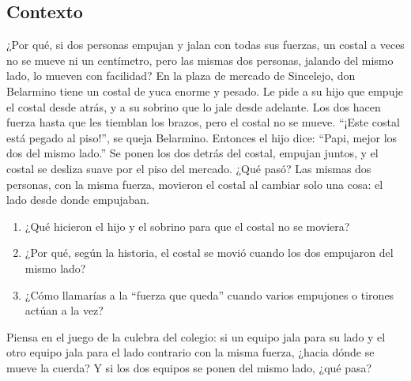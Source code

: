 \documentclass[
  spanish,
  letterpaper,
  12pt,
  oneside,
  open=any,
  DIV=15]{scrbook}
\providecommand{\tightlist}{%
  \setlength{\itemsep}{0pt}\setlength{\parskip}{0pt}}
\begin{document}
\subsection{Contexto}\label{contexto-2}

¿Por qué, si dos personas empujan y jalan con todas sus fuerzas, un
costal a veces no se mueve ni un centímetro, pero las mismas dos
personas, jalando del mismo lado, lo mueven con facilidad? En la plaza
de mercado de Sincelejo, don Belarmino tiene un costal de yuca enorme y
pesado. Le pide a su hijo que empuje el costal desde atrás, y a su
sobrino que lo jale desde adelante. Los dos hacen fuerza hasta que les
tiemblan los brazos, pero el costal no se mueve. ``¡Este costal está
pegado al piso!'', se queja Belarmino. Entonces el hijo dice: ``Papi,
mejor los dos del mismo lado.'' Se ponen los dos detrás del costal,
empujan juntos, y el costal se desliza suave por el piso del mercado.
¿Qué pasó? Las mismas dos personas, con la misma fuerza, movieron el
costal al cambiar solo una cosa: el lado desde donde empujaban.

\begin{tcolorbox}[enhanced jigsaw, arc=.35mm, bottomrule=.15mm, bottomtitle=1mm, breakable, colback=white, colbacktitle=quarto-callout-note-color!10!white, colframe=quarto-callout-note-color-frame, coltitle=black, left=2mm, leftrule=.75mm, opacityback=0, opacitybacktitle=0.6, rightrule=.15mm, title=\textcolor{quarto-callout-note-color}{\faInfo}\hspace{0.5em}{Reflexiona y Conecta (Preguntas de Comprensión)}, titlerule=0mm, toprule=.15mm, toptitle=1mm]

\begin{enumerate}
\def\labelenumi{\arabic{enumi}.}
\tightlist
\item
  ¿Qué hicieron el hijo y el sobrino para que el costal no se moviera?
\item
  ¿Por qué, según la historia, el costal se movió cuando los dos
  empujaron del mismo lado?
\item
  ¿Cómo llamarías a la ``fuerza que queda'' cuando varios empujones o
  tirones actúan a la vez?
\end{enumerate}

\end{tcolorbox}

\begin{tcolorbox}[enhanced jigsaw, arc=.35mm, bottomrule=.15mm, bottomtitle=1mm, breakable, colback=white, colbacktitle=quarto-callout-tip-color!10!white, colframe=quarto-callout-tip-color-frame, coltitle=black, left=2mm, leftrule=.75mm, opacityback=0, opacitybacktitle=0.6, rightrule=.15mm, title=\textcolor{quarto-callout-tip-color}{\faLightbulb}\hspace{0.5em}{Apoyo Procedimental (Pista)}, titlerule=0mm, toprule=.15mm, toptitle=1mm]

Piensa en el juego de la culebra del colegio: si un equipo jala para su
lado y el otro equipo jala para el lado contrario con la misma fuerza,
¿hacia dónde se mueve la cuerda? Y si los dos equipos se ponen del mismo
lado, ¿qué pasa?

\end{tcolorbox}
\end{document}
